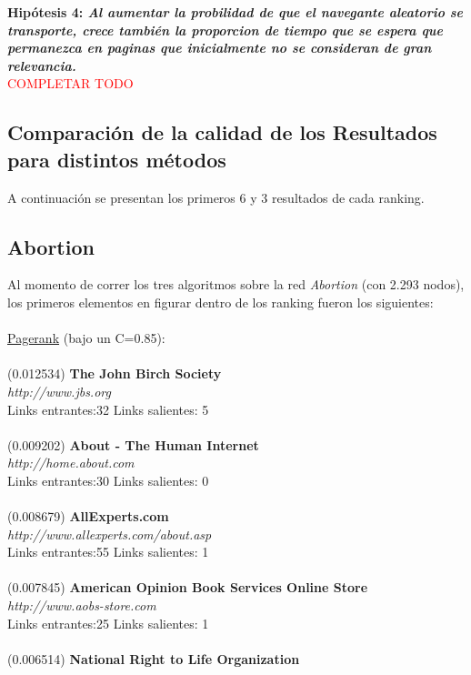 \documentclass[a4paper]{article}
\begin{document}
\newpage


\textbf{Hipótesis 4: \itshape{Al aumentar la probilidad de que el navegante aleatorio se transporte, crece también la proporcion de tiempo que se espera que permanezca en paginas que inicialmente no se consideran de gran relevancia.
 }}\\
\textcolor{red}{COMPLETAR TODO}\\

\newpage

\subsection{Comparaci\'on de la calidad de los Resultados para distintos m\'etodos}
A continuaci\'on se presentan los primeros 6 y 3 resultados de cada ranking.
\subsection*{Abortion}
\indent Al momento de correr los tres algoritmos sobre la red \emph{Abortion} (con 2.293 nodos), los primeros elementos en figurar dentro de los ranking fueron los siguientes: \\
\\
\underline{Pagerank} (bajo un C=0.85): \\
\\
(0.012534) \textbf{The John Birch Society} \\
\textit{http://www.jbs.org} \\
Links entrantes:32 \indent Links salientes: 5\\
\\
(0.009202) \textbf{About - The Human Internet} \\
\textit{http://home.about.com} \\
Links entrantes:30 \indent Links salientes: 0\\
\\
(0.008679)\textbf{ AllExperts.com }\\
\textit{http://www.allexperts.com/about.asp} \\
Links entrantes:55 \indent Links salientes: 1\\
\\
(0.007845) \textbf{American Opinion Book Services Online Store }\\
\textit{http://www.aobs-store.com} \\
Links entrantes:25 \indent Links salientes: 1\\
\\
(0.006514) \textbf{National Right to Life Organization} \\
\end{document}
